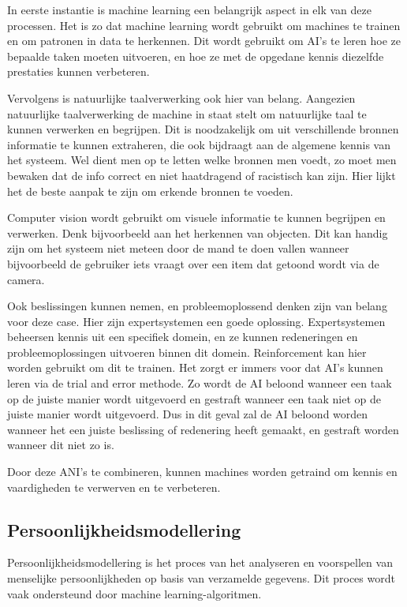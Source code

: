 In eerste instantie is machine learning een belangrijk aspect in elk van deze processen. Het is zo dat machine learning wordt gebruikt om machines te trainen en om patronen in data te herkennen. Dit wordt gebruikt om AI's te leren hoe ze bepaalde taken moeten uitvoeren, en hoe ze met de opgedane kennis diezelfde prestaties kunnen verbeteren.

Vervolgens is natuurlijke taalverwerking ook hier van belang. Aangezien natuurlijke taalverwerking de machine in staat stelt om natuurlijke taal te kunnen verwerken en begrijpen. Dit is noodzakelijk om uit verschillende bronnen informatie te kunnen extraheren, die ook bijdraagt aan de algemene kennis van het systeem. Wel dient men op te letten welke bronnen men voedt, zo moet men bewaken dat de info correct en niet haatdragend of racistisch kan zijn. Hier lijkt het de beste aanpak te zijn om erkende bronnen te voeden.

Computer vision wordt gebruikt om visuele informatie te kunnen begrijpen en verwerken. Denk bijvoorbeeld aan het herkennen van objecten. Dit kan handig zijn om het systeem niet meteen door de mand te doen vallen wanneer bijvoorbeeld de gebruiker iets vraagt over een item dat getoond wordt via de camera. 

Ook beslissingen kunnen nemen, en probleemoplossend denken zijn van belang voor deze case. Hier zijn expertsystemen een goede oplossing. Expertsystemen beheersen kennis uit een specifiek domein, en ze kunnen redeneringen en probleemoplossingen uitvoeren binnen dit domein. Reinforcement kan hier worden gebruikt om dit te trainen. Het zorgt er immers voor dat AI's kunnen leren via de trial and error methode. Zo wordt de AI beloond wanneer een taak op de juiste manier wordt uitgevoerd en gestraft wanneer een taak niet op de juiste manier wordt uitgevoerd. Dus in dit geval zal de AI beloond worden wanneer het een juiste beslissing of redenering heeft gemaakt, en gestraft worden wanneer dit niet zo is.

Door deze ANI's te combineren, kunnen machines worden getraind om kennis en vaardigheden te verwerven en te verbeteren.

\subsection{Persoonlijkheidsmodellering}

Persoonlijkheidsmodellering is het proces van het analyseren en voorspellen van menselijke persoonlijkheden op basis van verzamelde gegevens. Dit proces wordt vaak ondersteund door machine learning-algoritmen.

